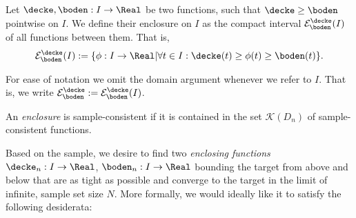 




\begin{defn}[Enclosure]
Let $\decke,\boden: I \to \Real$ be two functions, such that $\decke
\geq \boden$ pointwise on $I$. We define their enclosure on $I$ as
the compact interval $\mathcal E^\decke_\boden (I)$ of all functions
between them. That is, \[\mathcal E^\decke_\boden (I) := \{\phi: I
\to \Real \vert \forall t \in I: \decke(t) \geq \phi(t) \geq
\boden(t) \}.\]
\end{defn}
For ease of notation we omit the domain argument whenever we refer
to $I$. That is, we write  $\mathcal E^\decke_\boden :=\mathcal
E^\decke_\boden (I)$.


An \emph{enclosure} is sample-consistent if it is contained in the set $\mathcal K(D_n)$ of sample-consistent functions. 

Based on the sample, we desire to find two
\emph{enclosing functions} $\decke_n: I \to \Real$, $\mathfrak
\boden_n: I \to \Real$ bounding the target from above and below that
are as tight as possible and converge to the target in the limit of
infinite, sample set size $N$. 
More formally, we would ideally like it to satisfy the following desiderata:

